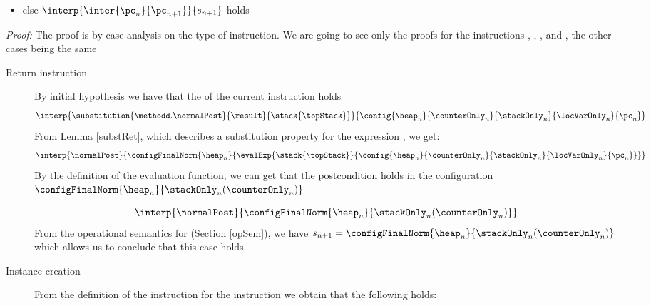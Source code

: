 \begin{lemma}
\begin{itemize}
       \item  else $ \interp{\inter{\pc_n}{\pc_{n+1}}}{s_{n+1}}  $   holds 
  \end{itemize} 
\end{lemma}
\textit{Proof:}
The proof is by case analysis on the type of instruction. %
We are going to see only the proofs for the instructions 
\return , \load, \new, \putfield{} and \invoke{}, the other cases being the same
\begin{description} 
		\item[ Return instruction]
		  By initial hypothesis we have that the \wpName{} of the current instruction holds
		 \begin{equation*}
          \interp {\substitution{ \methodd.\normalPost }{ \result }{\stack{\topStack} }}  { \config{\heap_n }{\counterOnly_n }{\stackOnly_n }{\locVarOnly_n }{\pc_n } }  
\end{equation*}
		 From Lemma \ref{substRet}, which describes a substitution property for the expression \result, we get:  
		  $$\interp { \normalPost} { \configFinalNorm{\heap_n  }
				                                   { \evalExp{ \stack{\topStack}}{\config{\heap_n }{\counterOnly_n }{\stackOnly_n }{\locVarOnly_n }{\pc_n } } }
                         }$$
			 By the definition of the evaluation function, we can get that the postcondition \normalPost{} 
			 holds in the configuration  $\configFinalNorm{\heap_n  }   { \stackOnly_n ( \counterOnly_n  )  }$
			
			 $$  \interp{ \normalPost} { \configFinalNorm{\heap_n  }  
							    { \stackOnly_n ( \counterOnly_n  )  } } $$
			From the operational semantics for \return (Section \ref{opSem}), we have $ s_{n+1} = \configFinalNorm{\heap_n  } { \stackOnly_n ( \counterOnly_n  )  }$
			which allows us to conclude that this case holds.
							    
	
			 
	\item [Instance creation]
	        From the definition of the \wpName{} instruction for the instruction \new{} we obtain that the following holds:
			 

\end{description}
